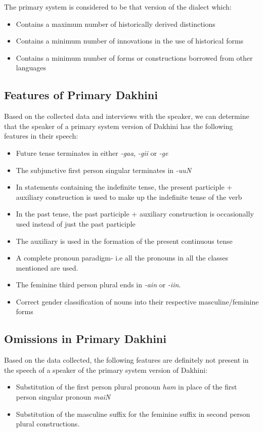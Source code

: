 \documentclass[a4paper]{article}
\begin{document}
The primary system is considered to be that version of the dialect which:

\begin{itemize}
\item
Contains a maximum number of historically derived distinctions
\item
Contains a minimum number of innovations in the use of historical forms
\item
Contains a minimum number of forms or constructions borrowed from other languages
\end{itemize}

\subsection{Features of Primary Dakhini}

Based on the collected data and interviews with the speaker, we can determine that the speaker of a primary system version of Dakhini has the following features in their speech:

\begin{itemize}
\item
Future tense terminates in either \textit{-gaa}, \textit{-gii} or \textit{-ge}
\item
The subjunctive first person singular terminates in \textit{-uuN}
\item
In statements containing the indefinite tense, the present participle + auxiliary construction is used to make up the indefinite tense of the verb
\item
In the past tense, the past participle + auxiliary construction is occasionally used instead of just the past participle
\item
The auxiliary is used in the formation of the present continuous tense
\item
A complete pronoun paradigm- i.e all the pronouns in all the classes mentioned are used.
\item
The feminine third person plural ends in \textit{-ain} or \textit{-iin}.
\item
Correct gender classification of nouns into their respective masculine/feminine forms
\end{itemize}

\subsection{Omissions in Primary Dakhini}

Based on the data collected, the following features are definitely not present in the speech of a speaker of the primary system version of Dakhini:

\begin{itemize}
\item
Substitution of the first person plural pronoun \textit{ham} in place of the first person singular pronoun \textit{maiN}
\item
Substitution of the masculine suffix for the feminine suffix in second person plural constructions.
\end{itemize}
\end{document}
